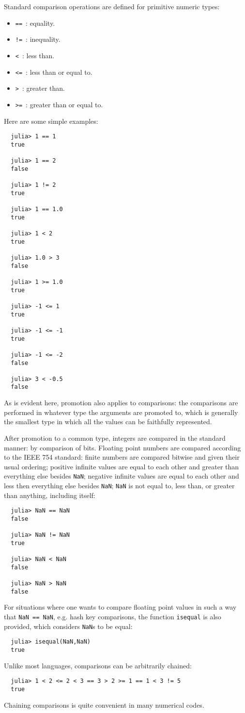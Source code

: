 \documentclass{article}
\begin{document}
Standard comparison operations are defined for primitive numeric types:
\begin{itemize}
  \item \verb|==|~: equality.
  \item \verb|!=|~: inequality.
  \item \verb|<|~: less than.
  \item \verb|<=|~: less than or equal to.
  \item \verb|>|~: greater than.
  \item \verb|>=|~: greater than or equal to.
\end{itemize}
Here are some simple examples:
\begin{verbatim}
  julia> 1 == 1
  true

  julia> 1 == 2
  false

  julia> 1 != 2
  true
  
  julia> 1 == 1.0
  true

  julia> 1 < 2
  true

  julia> 1.0 > 3
  false

  julia> 1 >= 1.0
  true

  julia> -1 <= 1
  true

  julia> -1 <= -1
  true

  julia> -1 <= -2
  false

  julia> 3 < -0.5
  false
\end{verbatim}
As is evident here, promotion also applies to comparisons:
the comparisons are performed in whatever type the arguments are promoted to, which is generally the smallest type in which all the values can be faithfully represented.

After promotion to a common type, integers are compared in the standard manner:
by comparison of bits.
Floating point numbers are compared according to the IEEE 754 standard:
finite numbers are compared bitwise and given their usual ordering;
positive infinite values are equal to each other and greater than everything else besides \verb|NaN|;
negative infinite values are equal to each other and less then everything else besides \verb|NaN|;
\verb|NaN| is not equal to, less than, or greater than anything, including itself:
\begin{verbatim}
  julia> NaN == NaN
  false

  julia> NaN != NaN
  true

  julia> NaN < NaN
  false

  julia> NaN > NaN
  false
\end{verbatim}
For situations where one wants to compare floating point values in such a way that \verb|NaN == NaN|, e.g. hash key comparisons, the function \verb|isequal| is also provided, which considers \verb|NaN|s to be equal:
\begin{verbatim}
  julia> isequal(NaN,NaN)
  true
\end{verbatim}
Unlike most languages, comparisons can be arbitrarily chained:
\begin{verbatim}
  julia> 1 < 2 <= 2 < 3 == 3 > 2 >= 1 == 1 < 3 != 5
  true
\end{verbatim}
Chaining comparisons is quite convenient in many numerical codes.
\end{document}
